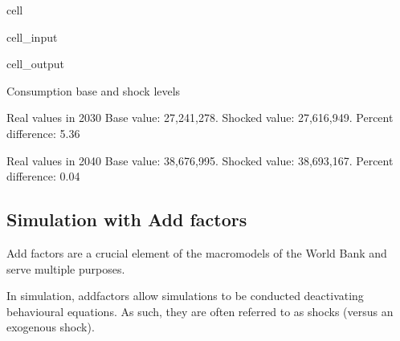 \documentclass[letterpaper,10pt,english]{jupyterBook}
\begin{document}
\begin{sphinxuseclass}{cell}
\begin{sphinxVerbatimInput}
\begin{sphinxuseclass}{cell_input}
\begin{sphinxVerbatim}[commandchars=\\\{\}]
    \PYG{p}{[}\PYG{p}{]}\PYG{p}{[}\PYG{p}{]}\PYG{p}{[}\PYG{p}{]}
\end{sphinxVerbatim}

\end{sphinxuseclass}\end{sphinxVerbatimInput}
\begin{sphinxVerbatimOutput}

\begin{sphinxuseclass}{cell_output}
\begin{sphinxVerbatim}[commandchars=\\\{\}]
Consumption base and shock levels

Real values in 2030
Base value:  27,241,278.	Shocked value: 27,616,949.
Percent difference: 5.36

Real values in 2040
Base value:  38,676,995.	Shocked value: 38,693,167.
Percent difference: 0.04
\end{sphinxVerbatim}

\end{sphinxuseclass}\end{sphinxVerbatimOutput}

\end{sphinxuseclass}

\subsection{Simulation with Add factors}
\label{\detokenize{content/06_WBModels/ScenarioAnalysis:simulation-with-add-factors}}
\sphinxAtStartPar
Add factors are a crucial element of the macromodels of the World Bank and serve multiple purposes.

\sphinxAtStartPar
In simulation, add\sphinxhyphen{}factors allow simulations to be conducted  de\sphinxhyphen{}activating behavioural equations.  As such, they are often referred to as  shocks (versus an exogenous shock).
\end{document}
